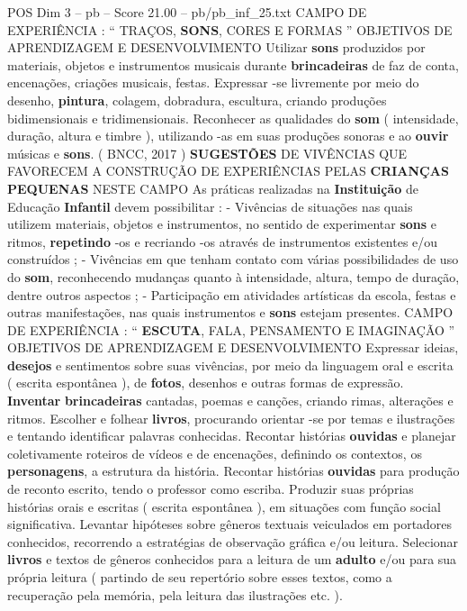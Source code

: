 \begin{textsample}{POS Dim 3 – pb – Score 21.00 – pb/pb\_inf\_25.txt}  \label{ex:f3_pos_087}
CAMPO DE EXPERIÊNCIA : “ TRAÇOS, \textbf{SONS}, CORES E FORMAS ” OBJETIVOS DE APRENDIZAGEM E DESENVOLVIMENTO Utilizar \textbf{sons} produzidos por materiais, objetos e instrumentos musicais durante \textbf{brincadeiras} de faz de conta, encenações, criações musicais, festas.
Expressar -se livremente por meio do desenho, \textbf{pintura}, colagem, dobradura, escultura, criando produções bidimensionais e tridimensionais.
Reconhecer as qualidades do \textbf{som} ( intensidade, duração, altura e timbre ), utilizando -as em suas produções sonoras e ao \textbf{ouvir} músicas e \textbf{sons}. ( BNCC, 2017 ) \textbf{SUGESTÕES} DE VIVÊNCIAS QUE FAVORECEM A CONSTRUÇÃO DE EXPERIÊNCIAS PELAS \textbf{CRIANÇAS} \textbf{PEQUENAS} NESTE CAMPO As práticas realizadas na \textbf{Instituição} de Educação \textbf{Infantil} devem possibilitar : - Vivências de situações nas quais utilizem materiais, objetos e instrumentos, no sentido de experimentar \textbf{sons} e ritmos, \textbf{repetindo} -os e recriando -os através de instrumentos existentes e/ou construídos ; - Vivências em que tenham contato com várias possibilidades de uso do \textbf{som}, reconhecendo mudanças quanto à intensidade, altura, tempo de duração, dentre outros aspectos ; - Participação em atividades artísticas da escola, festas e outras manifestações, nas quais instrumentos e \textbf{sons} estejam presentes.
CAMPO DE EXPERIÊNCIA : “ \textbf{ESCUTA}, FALA, PENSAMENTO E IMAGINAÇÃO ” OBJETIVOS DE APRENDIZAGEM E DESENVOLVIMENTO Expressar ideias, \textbf{desejos} e sentimentos sobre suas vivências, por meio da linguagem oral e escrita ( escrita espontânea ), de \textbf{fotos}, desenhos e outras formas de expressão. \textbf{Inventar} \textbf{brincadeiras} cantadas, poemas e canções, criando rimas, alterações e ritmos.
Escolher e folhear \textbf{livros}, procurando orientar -se por temas e ilustrações e tentando identificar palavras conhecidas.
Recontar histórias \textbf{ouvidas} e planejar coletivamente roteiros de vídeos e de encenações, definindo os contextos, os \textbf{personagens}, a estrutura da história.
Recontar histórias \textbf{ouvidas} para produção de reconto escrito, tendo o professor como escriba.
Produzir suas próprias histórias orais e escritas ( escrita espontânea ), em situações com função social significativa.
Levantar hipóteses sobre gêneros textuais veiculados em portadores conhecidos, recorrendo a estratégias de observação gráfica e/ou leitura.
Selecionar \textbf{livros} e textos de gêneros conhecidos para a leitura de um \textbf{adulto} e/ou para sua própria leitura ( partindo de seu repertório sobre esses textos, como a recuperação pela memória, pela leitura das ilustrações etc. ).

\end{textsample}
